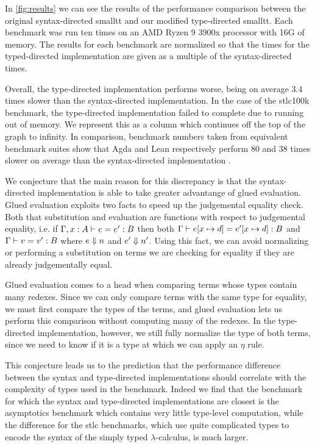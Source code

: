 In \autoref{fig:results} we can see the results of the performance comparison between the original syntax-directed smalltt and our modified type-directed smalltt.
Each benchmark was run ten times on an AMD Ryzen 9 3900x processor with 16G of memory.
The results for each benchmark are normalized so that the times for the typed-directed implementation are given as a multiple of the syntax-directed times.

Overall, the type-directed implementation performs worse, being on average 3.4 times slower than the syntax-directed implementation.
In the case of the stlc100k benchmark, the type-directed implementation failed to complete due to running out of memory.
We represent this as a column which continues off the top of the graph to infinity.
In comparison, benchmark numbers taken from equivalent benchmark suites show that Agda and Lean respectively perform 80 and 38 times slower on average than the syntax-directed implementation \citep{smalltt}.

We conjecture that the main reason for this discrepancy is that the syntax-directed implementation is able to take greater advantange of glued evaluation.
Glued evaluation exploits two facts to speed up the judgemental equality check.
Both that substitution and evaluation are functions with respect to judgemental equality, i.e. if $\Gamma, x : A \vdash e = e' : B$ then both $\Gamma \vdash e [x \mapsto d] = e' [x \mapsto d] : B$ and $\Gamma \vdash v = v' : B$ where $e \Downarrow n$ and $e' \Downarrow n'$.
Using this fact, we can avoid normalizing or performing a substitution on terms we are checking for equality if they are already judgementally equal.

Glued evaluation comes to a head when comparing terms whose types contain many redexes.
Since we can only compare terms with the same type for equality, we must first compare the types of the terms, and glued evaluation lets us perform this comparison without computing many of the redexes.
In the type-directed implementation, however, we still fully normalize the type of both terms, since we need to know if it is a type at which we can apply an $\eta$ rule.

This conjecture leads us to the prediction that the performance difference between the syntax and type-directed implementations should correlate with the complexity of types used in the benchmark.
Indeed we find that the benchmark for which the syntax and type-directed implementations are closest is the asymptotics benchmark which contains very little type-level computation, while the difference for the stlc benchmarks, which use quite complicated types to encode the syntax of the simply typed $\lambda$-calculus, is much larger.

